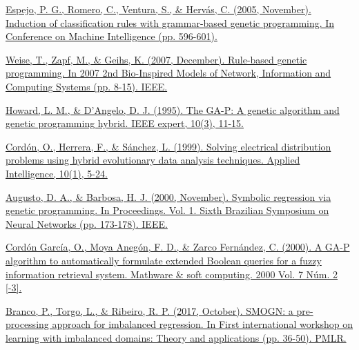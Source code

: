 \begin{thebibliography}{9}

	\href{https://www.researchgate.net/profile/Sebastian-Ventura/publication/228722056_C_Induction_of_Classification_Rules_with_Grammar-Based_Genetic_Programming/links/09e41510a07a3e3047000000/C-Induction-of-Classification-Rules-with-Grammar-Based-Genetic-Programming.pdf}{Espejo, P. G., Romero, C., Ventura, S., \& Hervás, C. (2005, November). Induction of classification rules with grammar-based genetic programming. In Conference on Machine Intelligence (pp. 596-601).}


	\href{https://ieeexplore.ieee.org/abstract/document/4610073}{Weise, T., Zapf, M., \& Geihs, K. (2007, December). Rule-based genetic programming. In 2007 2nd Bio-Inspired Models of Network, Information and Computing Systems (pp. 8-15). IEEE.}


	\href{https://ieeexplore.ieee.org/stamp/stamp.jsp?tp=&arnumber=393137}{Howard, L. M., \& D'Angelo, D. J. (1995). The GA-P: A genetic algorithm and genetic programming hybrid. IEEE expert, 10(3), 11-15.}


	\href{https://link.springer.com/article/10.1023/A:1008384630089}{Cordón, O., Herrera, F., \& Sánchez, L. (1999). Solving electrical distribution problems using hybrid evolutionary data analysis techniques. Applied Intelligence, 10(1), 5-24.}



	\href{https://ieeexplore.ieee.org/document/889734}{Augusto, D. A., \& Barbosa, H. J. (2000, November). Symbolic regression via genetic programming. In Proceedings. Vol. 1. Sixth Brazilian Symposium on Neural Networks (pp. 173-178). IEEE.}


	\href{https://upcommons.upc.edu/handle/2099/3586}{Cordón García, O., Moya Anegón, F. D., \& Zarco Fernández, C. (2000). A GA-P algorithm to automatically formulate extended Boolean queries for a fuzzy information retrieval system. Mathware \& soft computing. 2000 Vol. 7 Núm. 2 [-3].}


	\href{http://proceedings.mlr.press/v74/branco17a/branco17a.pdf}{Branco, P., Torgo, L., \& Ribeiro, R. P. (2017, October). SMOGN: a pre-processing approach for imbalanced regression. In First international workshop on learning with imbalanced domains: Theory and applications (pp. 36-50). PMLR.}


\end{thebibliography}
